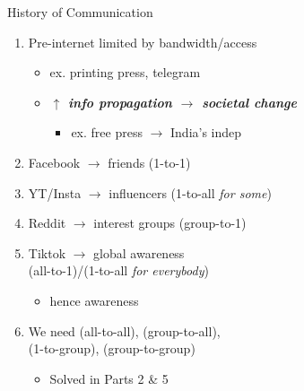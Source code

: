 \documentclass[aspectratio=35]{beamer} %
\begin{document}
\begin{frame}{History of Communication}
\vspace{-1.1in}
\begin{enumerate}
    \item Pre-internet limited by bandwidth/access
        \begin{itemize}
            \item ex. printing press, telegram
            \item \textit{\textbf{$\uparrow$ info propagation $\rightarrow$ societal change}}
            \begin{itemize}
                \item ex. free press $\rightarrow$ India's indep
            \end{itemize}
        \end{itemize}
    \item Facebook $\rightarrow$ friends (1-to-1)
    \item YT/Insta $\rightarrow$ influencers (1-to-all \textit{for some})
    \item Reddit $\rightarrow$ interest groups (group-to-1)
    \item Tiktok $\rightarrow$ global awareness\\(all-to-1)/(1-to-all \textit{for everybody})
    \begin{itemize}\item hence  awareness\end{itemize}
    \item We need (all-to-all), (group-to-all),\\(1-to-group), (group-to-group)
    \begin{itemize}
        \item Solved in Parts 2 \& 5
    \end{itemize}
\end{enumerate}
\end{frame}
\end{document}
